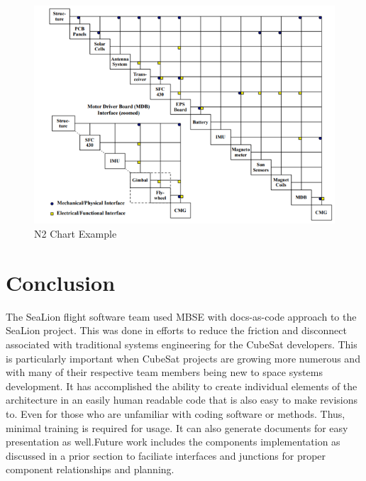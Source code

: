 \documentclass[journal,article,submit,pdftex,moreauthors]{Definitions/mdpi}
\begin{document}
\begin{figure}[H]
    \includegraphics[width=10.5 cm]{assets/N2.png}
    \caption{N2 Chart Example}
	\label{fig:N2}
    \end{figure}   
\unskip

\section{Conclusion}
The SeaLion flight software team used MBSE with docs-as-code approach to the SeaLion project. This was done in efforts to reduce the friction and disconnect associated with traditional systems engineering for the CubeSat developers.  This is particularly important when CubeSat projects are growing more numerous and with many of their respective team members being new to space systems development.   It has accomplished the ability to create individual elements of the architecture in an easily human readable code that is also easy to make revisions to.  Even for those who are unfamiliar with coding software or methods.  Thus, minimal training is required for usage.  It can also generate documents for easy presentation as well.Future work includes the components implementation as discussed in a prior section to faciliate interfaces and junctions for proper component relationships and planning.

\vspace{6pt} 

\end{document}
